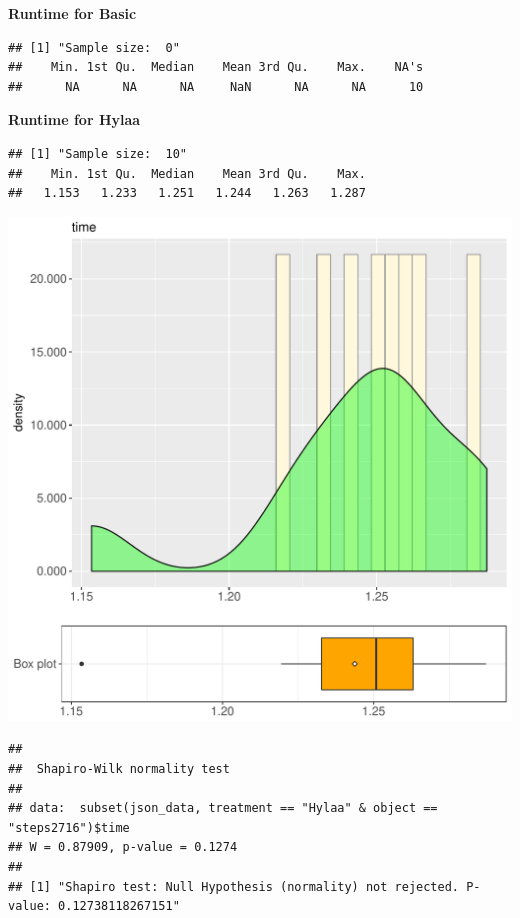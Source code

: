 \documentclass{article}\usepackage[]{graphicx}\usepackage[]{color}
\makeatletter
\def\maxwidth{ %
  \ifdim\Gin@nat@width>\linewidth
    \linewidth
  \else
    \Gin@nat@width
  \fi
}
\newenvironment{kframe}{%
 \def\at@end@of@kframe{}%
 \ifinner\ifhmode%
  \def\at@end@of@kframe{\end{minipage}}%
  \begin{minipage}{\columnwidth}%
 \fi\fi%
 \def\FrameCommand##1{\hskip\@totalleftmargin \hskip-\fboxsep
 \colorbox{shadecolor}{##1}\hskip-\fboxsep
     \hskip-\linewidth \hskip-\@totalleftmargin \hskip\columnwidth}%
 \MakeFramed {\advance\hsize-\width
   \@totalleftmargin\z@ \linewidth\hsize
   \@setminipage}}%
 {\par\unskip\endMakeFramed%
 \at@end@of@kframe}
\newenvironment{knitrout}{}{} %
\makeatother
\begin{document}
 \textbf{Runtime for Basic}
\begin{knitrout}
\color{fgcolor}\begin{kframe}
\begin{verbatim}
## [1] "Sample size:  0"
##    Min. 1st Qu.  Median    Mean 3rd Qu.    Max.    NA's 
##      NA      NA      NA     NaN      NA      NA      10
\end{verbatim}
\end{kframe}
\end{knitrout}
 \textbf{Runtime for Hylaa}
\begin{knitrout}
\color{fgcolor}\begin{kframe}
\begin{verbatim}
## [1] "Sample size:  10"
##    Min. 1st Qu.  Median    Mean 3rd Qu.    Max. 
##   1.153   1.233   1.251   1.244   1.263   1.287
\end{verbatim}
\end{kframe}
\includegraphics[width=\maxwidth]{figure/RH3_Hylaa_steps2716-1} 
\begin{kframe}\begin{verbatim}
## 
## 	Shapiro-Wilk normality test
## 
## data:  subset(json_data, treatment == "Hylaa" & object == "steps2716")$time
## W = 0.87909, p-value = 0.1274
## 
## [1] "Shapiro test: Null Hypothesis (normality) not rejected. P-value: 0.12738118267151"
\end{verbatim}
\end{kframe}
\end{knitrout}
  
\end{document}
